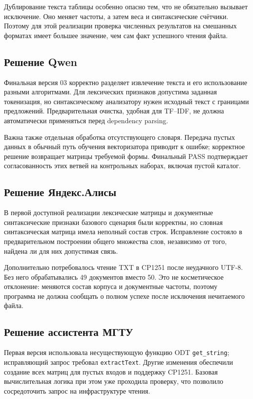 Дублирование текста таблицы особенно опасно тем, что не обязательно вызывает исключение. Оно меняет частоты, а затем веса и синтаксические счётчики. Поэтому для этой реализации проверка численных результатов на смешанных форматах имеет большее значение, чем сам факт успешного чтения файла.

\subsection{Решение Qwen}
Финальная версия 03 корректно разделяет извлечение текста и его использование разными алгоритмами. Для лексических признаков допустима заданная токенизация, но синтаксическому анализатору нужен исходный текст с границами предложений. Предварительная очистка, удобная для TF--IDF, не должна автоматически применяться перед dependency parsing.

Важна также отдельная обработка отсутствующего словаря. Передача пустых данных в обычный путь обучения векторизатора приводит к ошибке; корректное решение возвращает матрицы требуемой формы. Финальный PASS подтверждает согласованность этих ветвей на контрольных наборах, включая пустой каталог.

\subsection{Решение Яндекс.Алисы}
В первой доступной реализации лексические матрицы и документные синтаксические признаки базового сценария были корректны, но словная синтаксическая матрица имела неполный состав строк. Исправление состояло в предварительном построении общего множества слов, независимо от того, найдена ли для них допустимая связь.

Дополнительно потребовалось чтение TXT в CP1251 после неудачного UTF-8. Без него обрабатывались 49 документов вместо 50. Это не косметическое отклонение: меняются состав корпуса и документные частоты, поэтому программа не должна сообщать о полном успехе после исключения нечитаемого файла.

\subsection{Решение ассистента МГТУ}
Первая версия использовала несуществующую функцию ODT \texttt{get\_string}; исправляющий запрос требовал \texttt{extractText}. Другие изменения обеспечили создание всех матриц для пустых входов и поддержку CP1251. Базовая вычислительная логика при этом уже проходила проверку, что позволило сосредоточить запрос на инфраструктуре чтения.


